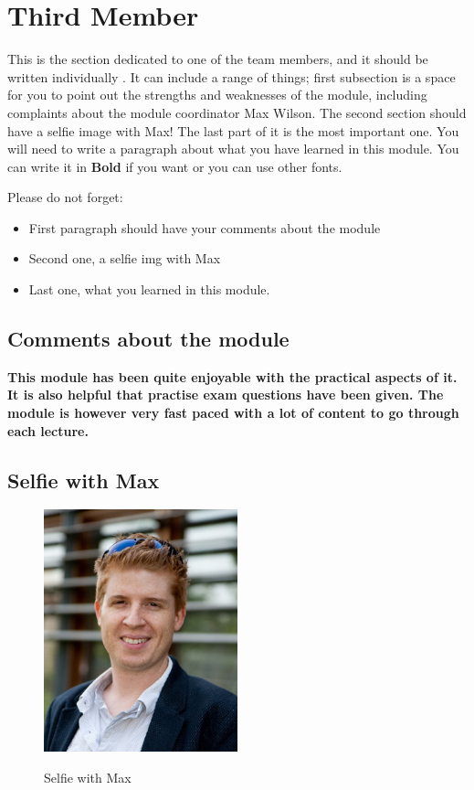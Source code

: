 \section{Third Member}
This is the section dedicated to one of the team members, and it should be written individually . It can include a range of things; first subsection is a space for you to point out the strengths and weaknesses of the module, including complaints about the module coordinator Max Wilson. The second section should have a selfie image with Max! The last part of it is the most important one. You will need to write a paragraph about what you have learned in this module. You can write it in \textbf{Bold} if you want or you can use other fonts. 

Please do not forget:
\begin{itemize}
	\item First paragraph should have your comments about the module
	\item Second one, a selfie img with Max
	\item Last one, what you learned in this module.
\end{itemize}

\subsection{Comments about the module}
\textbf{This module has been quite enjoyable with the practical aspects of it. It is also helpful that practise exam questions have been given. The module is however very fast paced with a lot of content to go through each lecture.}  

\subsection{Selfie with Max}

\begin{figure}[h]
\caption{Selfie with Max}
\centering
\includegraphics[width=0.5\textwidth]{max.jpg}
\label{fig:selfie}
\end{figure}

